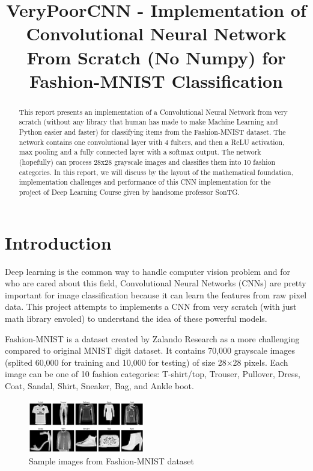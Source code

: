 \documentclass[conference]{IEEEtran}
\title{VeryPoorCNN - Implementation of Convolutional Neural Network From Scratch (No Numpy) for Fashion-MNIST Classification}
\author{\IEEEauthorblockN{Le Minh Hoang}
\IEEEauthorblockA{Deep Learning Project 2025\\
University of Science and Technology of Hanoi\\
Email: hoanglm2440051@usth.edu.vn}}
\begin{document}
\maketitle

\begin{abstract}
This report presents an implementation of a Convolutional Neural Network from very scratch (without any library that human has made to make Machine Learning and Python easier and faster) for classifying items from the Fashion-MNIST dataset. The network contains one convolutional layer with 4 fulters, and then a ReLU activation, max pooling and a fully connected layer with a softmax output. The network (hopefully) can process 28x28 grayscale images and classifies them into 10 fashion categories. In this report, we will discuss by the layout of the mathematical foundation, implementation challenges and performance of this CNN implementation for the project of Deep Learning Course given by handsome professor SonTG.
\end{abstract}

\section{Introduction}

Deep learning is the common way to handle computer vision problem and for who are cared about this field, Convolutional Neural Networks (CNNs) are pretty important for image classification because it can learn the features from raw pixel data. This project attempts to implements a CNN from very scratch (with just math library envoled) to understand the idea of these powerful models.

Fashion-MNIST is a dataset created by Zalando Research as a more challenging compared to original MNIST digit dataset. It contains 70,000 grayscale images (splited 60,000 for training and 10,000 for testing) of size 28×28 pixels. Each image can be one of 10 fashion categories: T-shirt/top, Trouser, Pullover, Dress, Coat, Sandal, Shirt, Sneaker, Bag, and Ankle boot.

\begin{figure}[htbp]
    \centering
    \includegraphics[width=0.45\textwidth]{fashion_mnist_samples.png}
    \caption{Sample images from Fashion-MNIST dataset}
    \label{fig:fashion_samples}
\end{figure}
\end{document}
